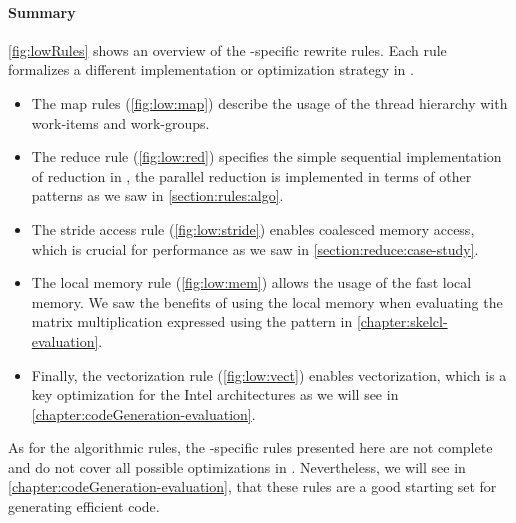 \paragraph{Summary}
\autoref{fig:lowRules} shows an overview of the \OpenCL-specific rewrite rules.
Each rule formalizes a different implementation or optimization strategy in \OpenCL.

\begin{itemize}
  \item The map rules (\autoref{fig:low:map}) describe the usage of the \OpenCL thread hierarchy with work-items and work-groups.

  \item The reduce rule (\autoref{fig:low:red}) specifies the simple sequential implementation of reduction in \OpenCL, the parallel reduction is implemented in terms of other patterns as we saw in \autoref{section:rules:algo}.

  \item The stride access rule (\autoref{fig:low:stride}) enables coalesced memory access, which is crucial for performance as we saw in \autoref{section:reduce:case-study}.

  \item The local memory rule (\autoref{fig:low:mem}) allows the usage of the fast local memory.
  We saw the benefits of using the local memory when evaluating the matrix multiplication expressed using the \allpairs pattern in \autoref{chapter:skelcl-evaluation}.

  \item Finally, the vectorization rule (\autoref{fig:low:vect}) enables vectorization, which is a key optimization for the Intel \CPU architectures as we will see in \autoref{chapter:codeGeneration-evaluation}.
\end{itemize}

As for the algorithmic rules, the \OpenCL-specific rules presented here are not complete and do not cover all possible optimizations in \OpenCL.
Nevertheless, we will see in \autoref{chapter:codeGeneration-evaluation}, that these rules are a good starting set for generating efficient \OpenCL code.

